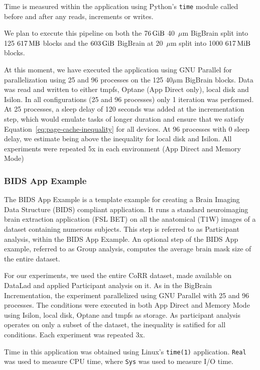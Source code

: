\documentclass[conference]{IEEEtran}
\newcommand{\bigbrain}{BigBrain }
\begin{document}
Time is measured within the application using Python's \texttt{time} module 
called before and after any reads, increments or writes.

We plan to execute this pipeline on both the $\SI{76}{\gibi\byte}$ 40~$\mu$m 
\bigbrain split into 125 $\SI{617}{\mega\byte}$ blocks and the $\SI{603}{\gibi\byte}$
\bigbrain at 20~$\mu$m split into 1000 $\SI{617}{\mebi\byte}$ blocks.

At this moment, we have executed the application using GNU Parallel for parallelization
using 25 and 96 processes on the 125 40$\mu$m \bigbrain blocks. Data was read and written to either
tmpfs, Optane (App Direct only), local disk and Isilon. In all configurations (25 and 96 processes)
only 1 iteration was performed. At 25 processes, a sleep delay of 120 seconds was added at the
incrementation step, which would emulate tasks of longer duration and ensure that we satisfy Equation~\ref{eq:page-cache-inequality} for all devices.
At 96 processes with 0 sleep delay, we estimate being above the inequality for local disk and Isilon.
All experiments were repeated 5x in each environment (App Direct and Memory Mode)

\subsubsection{BIDS App Example}

The BIDS App Example is a template example for creating a Brain Imaging Data Structure (BIDS)
compliant application. It runs a standard neuroimaging brain extraction application (FSL BET) 
on all the anatomical (T1W) images of a dataset containing numerous subjects. This step is 
referred to as Participant analysis, within the BIDS App Example. An optional
step of the BIDS App example, referred to as Group analysis, computes the average brain
mask size of the entire dataset.

For our experiments, we used the entire CoRR dataset, made available on DataLad and
applied Participant analysis on it. As in the BigBrain Incrementation, the experiment parallelized 
using GNU Parallel with 25 and 96 processes. The conditions were executed in both App Direct and Memory Mode
using Isilon, local disk, Optane and tmpfs as storage. As participant analysis operates on only a subset of the dataset,
the inequality is satified for all conditions. Each experiment was repeated 3x.

Time in this application was obtained using Linux's \texttt{time(1)} application.
\texttt{Real} was used to measure CPU time, where \texttt{Sys} was used to measure
I/O time.
\end{document}
